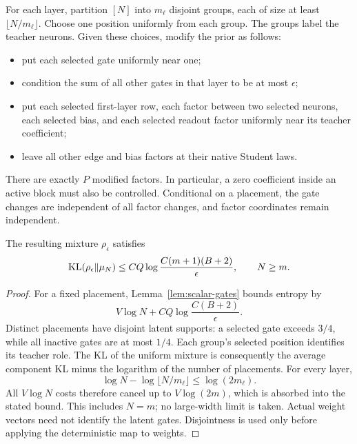 For each layer, partition $[N]$ into $m_\ell$ disjoint groups, each of size at least $\lfloor N/m_\ell\rfloor$. Choose one position uniformly from each group. The groups label the teacher neurons. Given these choices, modify the prior as follows:
\begin{itemize}
\item put each selected gate uniformly near one;
\item condition the sum of all other gates in that layer to be at most $\epsilon$;
\item put each selected first-layer row, each factor between two selected neurons, each selected bias, and each selected readout factor uniformly near its teacher coefficient;
\item leave all other edge and bias factors at their native Student laws.
\end{itemize}
There are exactly $P$ modified factors. In particular, a zero coefficient inside an active block must also be controlled. Conditional on a placement, the gate changes are independent of all factor changes, and factor coordinates remain independent.

\begin{lemma}\label{lem:entropy}
The resulting mixture $\rho_\epsilon$ satisfies
\[
 \operatorname{KL}(\rho_\epsilon\|\mu_N)
 \le CQ\log\frac{C(m+1)(B+2)}\epsilon,
 \qquad N\ge m.
\]
\end{lemma}
\begin{proof}
For a fixed placement, Lemma~\ref{lem:scalar-gates} bounds entropy by
\[
 V\log N+CQ\log\frac{C(B+2)}\epsilon.
\]
Distinct placements have disjoint latent supports: a selected gate exceeds $3/4$, while all inactive gates are at most $1/4$. Each group's selected position identifies its teacher role. The KL of the uniform mixture is consequently the average component KL minus the logarithm of the number of placements. For every layer,
\[
 \log N-\log\lfloor N/m_\ell\rfloor\le\log(2m_\ell).
\]
All $V\log N$ costs therefore cancel up to $V\log(2m)$, which is absorbed into the stated bound. This includes $N=m$; no large-width limit is taken. Actual weight vectors need not identify the latent gates. Disjointness is used only before applying the deterministic map to weights.
\end{proof}
